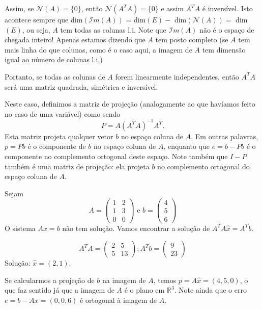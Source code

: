 Assim, se ${\mathcal{N}}(A) = \{ 0\}$, então ${\mathcal{N}}(A^TA) = \{0\}$ e assim $A^TA$ é inversível. Isto acontece sempre que dim$({\mathcal{I}}m(A))$ = dim$(E) - $ dim$({\mathcal{N}}(A)) = $ dim$(E)$, ou seja, $A$ tem todas as colunas l.i.  Note que ${\mathcal{I}}m(A)$ não é o espaço de chegada inteiro! Apenas estamos dizendo que $A$ tem posto completo (se $A$ tem mais linha do que colunas, como é o caso aqui, a imagem de $A$ tem dimensão igual ao número de colunas l.i.)

Portanto, se todas as colunas de $A$ forem linearmente independentes, então $A^TA$ será uma matriz quadrada, simétrica e inversível.

Neste caso, definimos a matriz de projeção (analogamente ao que havíamos feito no caso de uma variável) como sendo
\begin{equation*}
   P = A(A^TA)^{-1}A^T.
\end{equation*}
Esta matriz projeta qualquer vetor $b$ no espaço coluna de $A$. Em outras palavras, $p=Pb$ é o componente de $b$ no espaço coluna de $A$, enquanto que $e=b-Pb$ é o componente no complemento ortogonal deste espaço. Note também que $I-P$ também é uma matriz de projeção: ela projeta $b$ no complemento ortogonal do espaço coluna de $A$.

\begin{exemplo*}
 	Sejam
     \begin{equation*}
     	A = \begin{pmatrix} 1 & 2\\1 & 3\\0 & 0\end{pmatrix} \text{ e } b = \begin{pmatrix} 4\\5\\6\end{pmatrix}
     \end{equation*}
     O sistema $Ax=b$ não tem solução. Vamos encontrar a solução de $A^TA\hat{x}=A^Tb$.
    
     \begin{equation*}
     	A^TA = \begin{pmatrix} 2 & 5\\5 & 13\end{pmatrix}; A^Tb = \begin{pmatrix} 9\\23\end{pmatrix}
     \end{equation*}
     Solução: $\hat{x} = (2,1)$.
    
     Se calcularmos a projeção de $b$ na imagem de $A$, temos $p=A\hat{x} = (4,5,0)$, o que faz sentido já que a imagem de $A$ é o plano em ${\mathbb{R}}^3$. Note ainda que o erro $e = b-Ax = (0,0,6)$ é ortogonal à imagem de $A$.
\end{exemplo*}


